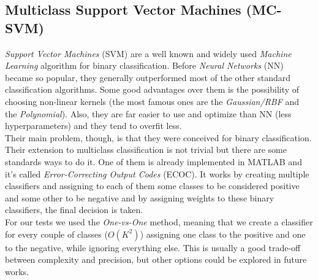 \subsection{Multiclass Support Vector Machines (MC-SVM)}
\label{subsec:svm}

\textit{Support Vector Machines} (SVM) are a well known and widely used \textit{Machine Learning} algorithm for binary classification. Before \textit{Neural Networks} (NN) became so popular, they generally outperformed most of the other standard classification algorithms. Some good advantages over them is the possibility of choosing non-linear kernels (the most famous ones are the \textit{Gaussian/RBF} and the \textit{Polynomial}). Also, they are far easier to use and optimize than NN (less hyperparameters) and they tend to overfit less.\\
%
Their main problem, though, is that they were conceived for binary classification. Their extension to multiclass classification is not trivial but there are some standards ways to do it. One of them is already implemented in MATLAB and it's called \textit{Error-Correcting Output Codes} (ECOC). It works by creating multiple classifiers and assigning to each of them some classes to be considered positive and some other to be negative and by assigning weights to these binary classifiers, the final decision is taken.\\
%
For our tests we used the \textit{One-vs-One} method, meaning that we create a classifier for every couple of classes ($O(K^2)$) assigning one class to the positive and one to the negative, while ignoring everything else. This is usually a good trade-off between complexity and precision, but other options could be explored in future works.
